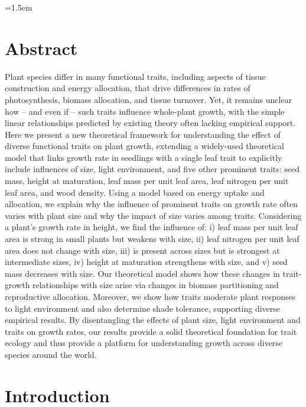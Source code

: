 \documentclass[a4paper,11pt]{article}
\date{}
\begin{document}
\mstitlepage
\noindent
\parindent=1.5em
\addtolength{\parskip}{.3em}


\section{Abstract}

Plant species differ in many functional traits, including aspects of tissue construction and energy allocation, that drive differences in rates of photosynthesis, biomass allocation, and tissue turnover. Yet, it remains unclear how -- and even if -- such traits influence whole-plant growth, with the simple linear relationships predicted by existing theory often lacking empirical support. Here we present a new theoretical framework for understanding the effect of diverse functional traits on plant growth, extending a widely-used theoretical model that links growth rate in seedlings with a single leaf trait to explicitly include influences of size, light environment, and five other prominent traits: seed mass, height at maturation, leaf mass per unit leaf area, leaf nitrogen per unit leaf area, and wood density. Using a model based on energy uptake and allocation, we explain why the influence of prominent traits on growth rate often varies with plant size and why the impact of size varies among traits. Considering a plant's growth rate in height, we find the influence of: i) leaf mass per unit leaf area is strong in small plants but weakens with size, ii) leaf nitrogen per unit leaf area does not change with size, iii) is present across sizes but is strongest at intermediate sizes, iv) height at maturation strengthens with size, and v) seed mass decreases with size. Our theoretical model shows how these changes in trait-growth relationships with size arise via changes in biomass partitioning and reproductive allocation. Moreover, we show how traits moderate plant responses to light environment and also determine shade tolerance, supporting diverse empirical results. By disentangling the effects of plant size, light environment and traits on growth rates, our results provide a solid theoretical foundation for trait ecology and thus provide a platform for understanding growth across diverse species around the world.

\section{Introduction}
\end{document}
